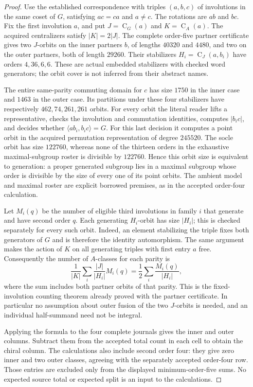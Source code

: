\documentclass[11pt]{article}
\newcommand{\C}{\operatorname{C}}
\begin{document}
\begin{proof}
Use the established correspondence with triples $(a,b,c)$ of
involutions in the same coset of $G$, satisfying $ac=ca$ and $a\ne c$.
The rotations are $ab$ and $bc$. Fix the first involution $a$, and put
$J=\C_G(a)$ and $K=\C_A(a)$. The acquired centralizers satisfy
$|K|=2|J|$. The complete order-five partner certificate gives two
$J$-orbits on the inner partners $b$, of lengths $40320$ and $4480$,
and two on the outer partners, both of length $29260$.
Their stabilizers $H_i=\C_J(a,b_i)$ have orders $4,36,6,6$.
These are actual embedded stabilizers with checked word generators;
the orbit cover is not inferred from their abstract names.

The entire same-parity commuting domain for $c$ has size $1750$ in the
inner case and $1463$ in the outer case. Its partitions under these
four stabilizers have respectively $462,74,261,261$ orbits. For every
orbit the literal reader lifts a representative, checks the involution
and commutation identities, computes $|b_i c|$, and decides whether
$\langle ab_i,b_i c\rangle=G$. For this last decision it computes a point
orbit in the acquired permutation representation of degree $245520$.
The socle orbit has size $122760$, whereas none of the thirteen orders
in the exhaustive maximal-subgroup roster is divisible by $122760$.
Hence this orbit size is equivalent to generation: a proper generated
subgroup lies in a maximal subgroup whose order is divisible by the
size of every one of its point orbits. The ambient model and maximal
roster are explicit borrowed premises, as in the accepted order-four
calculation.

Let $M_i(q)$ be the number of eligible third involutions in family $i$
that generate and have second order $q$. Each generating $H_i$-orbit
has size $|H_i|$; this is checked separately for every such orbit.
Indeed, an element stabilizing the triple fixes both generators of $G$
and is therefore the identity automorphism. The same argument makes
the action of $K$ on all generating triples with first entry $a$ free.
Consequently the number of $A$-classes for each parity is
\[
 \frac{1}{|K|}\sum_i\frac{|J|}{|H_i|}M_i(q)
 =\frac12\sum_i\frac{M_i(q)}{|H_i|},
\]
where the sum includes both partner orbits of that parity. This is the
fixed-involution counting theorem already proved with the partner
certificate. In particular no assumption about outer fusion of the two
$J$-orbits is needed, and an individual half-summand need not be integral.

Applying the formula to the four complete journals gives the inner and
outer columns. Subtract them from the accepted total count in each cell
to obtain the chiral column. The calculations also include second order
four: they give zero inner and two outer classes, agreeing with the
separately accepted order-four row. Those entries are excluded only from
the displayed minimum-order-five sums. No expected source total or
expected split is an input to the calculations.
\end{proof}
\end{document}
